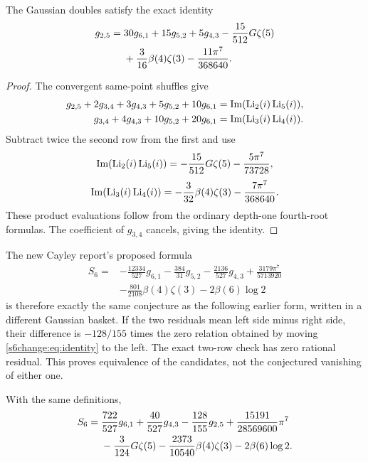 \begin{proposition}
\label{s6change:prop:coordinates}
The Gaussian doubles satisfy the exact identity
\begin{align}
 g_{2,5}={}&30g_{6,1}+15g_{5,2}+5g_{4,3}
 -\frac{15}{512}G\zeta(5)\notag\\
 &+\frac3{16}\beta(4)\zeta(3)-\frac{11\pi^7}{368640}.
 \label{s6change:eq:identity}
\end{align}
\end{proposition}
\begin{proof}
The convergent same-point shuffles give
\begin{align*}
 g_{2,5}+2g_{3,4}+3g_{4,3}+5g_{5,2}+10g_{6,1}
 &=\operatorname{Im}(\operatorname{Li}_2(i)\operatorname{Li}_5(i)),\\
 g_{3,4}+4g_{4,3}+10g_{5,2}+20g_{6,1}
 &=\operatorname{Im}(\operatorname{Li}_3(i)\operatorname{Li}_4(i)).
\end{align*}
Subtract twice the second row from the first and use
\[
 \operatorname{Im}(\operatorname{Li}_2(i)\operatorname{Li}_5(i))
 =-\frac{15}{512}G\zeta(5)-\frac{5\pi^7}{73728},
\]
\[
 \operatorname{Im}(\operatorname{Li}_3(i)\operatorname{Li}_4(i))
 =-\frac3{32}\beta(4)\zeta(3)-\frac{7\pi^7}{368640}.
\]
These product evaluations follow from the ordinary depth-one fourth-root
formulas. The coefficient of $g_{3,4}$ cancels, giving the identity.
\end{proof}
The new Cayley report's proposed formula
\begin{align*}
 S_6={}&-\frac{12334}{527}g_{6,1}-\frac{384}{31}g_{5,2}
 -\frac{2136}{527}g_{4,3}+\frac{3179\pi^7}{5713920}\\
 &-\frac{801}{2108}\beta(4)\zeta(3)-2\beta(6)\log2
\end{align*}
is therefore exactly the same conjecture as the following earlier form,
written in a different Gaussian basket. If the two residuals mean left
side minus right side, their difference is $-128/155$ times the zero
relation obtained by moving \eqref{s6change:eq:identity} to the left.
The exact two-row check has zero rational residual. This proves equivalence
of the candidates, not the conjectured vanishing of either one.

\begin{conjecture}\label{cycloquot:conj:S6}
With the same definitions,
\begin{align}
 S_6={}&\frac{722}{527}g_{6,1}
       +\frac{40}{527}g_{4,3}
       -\frac{128}{155}g_{2,5}
       +\frac{15191}{28569600}\pi^7\notag\\
      &-\frac3{124}G\zeta(5)
       -\frac{2373}{10540}\beta(4)\zeta(3)
       -2\beta(6)\log2. \label{cycloquot:eq:S6}
\end{align}
\end{conjecture}


